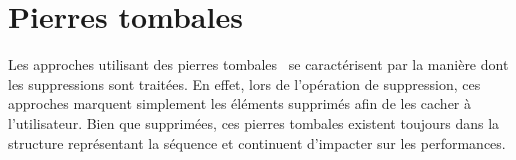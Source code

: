 

\section{Pierres tombales}

Les approches utilisant des pierres tombales~\cite{ahmed2011evaluating,
  conway2014language, grishchenko2010deep, oster2006data,
  preguica2009commutative, roh2011replicated, weiss2007wooki, wu2010partial,
  yu2012stringwise} se caractérisent par la manière dont les suppressions sont
traitées. En effet, lors de l'opération de suppression, ces approches marquent
simplement les éléments supprimés afin de les cacher à l'utilisateur. Bien que
supprimées, ces pierres tombales existent toujours dans la structure
représentant la séquence et continuent d'impacter sur les performances.

